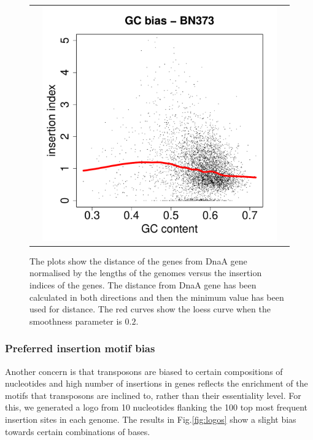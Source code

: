 \documentclass[12pt,letterpaper]{article}
\begin{document}
\begin{figure}
\begin{tabular}{c c c}
&\includegraphics[page=38, scale=0.25]{biases.pdf}&\\
\end{tabular}
\caption{The plots show the distance of the genes from DnaA gene normalised by the lengths of the genomes versus the insertion indices of the genes. The distance from DnaA gene has been calculated in both directions and then the minimum value has been used for distance. The red curves show the loess curve when the smoothness parameter is $0.2$.}
\label{fig:distance-bias}
\end{figure}

\subsubsection{Preferred insertion motif bias}
Another concern is that transposons are biased to certain compositions of nucleotides and high number of insertions in genes reflects the enrichment of the motifs that transposons are inclined to, rather than their essentiality level. For this, we generated a logo from 10 nucleotides flanking the 100 top most frequent insertion sites in each genome. The results in Fig.\@  \ref{fig:logos} show a slight bias towards certain combinations of bases.
\end{document}

